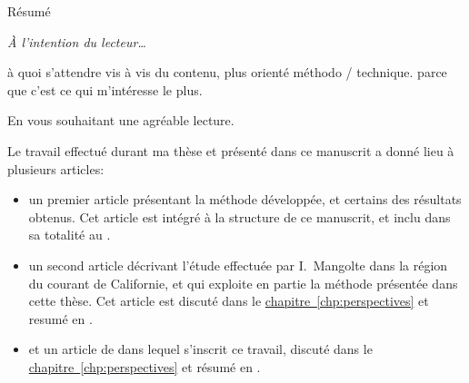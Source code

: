 
Résumé


\clearpage

\vspace{5\onelineskip}
\par\addvspace{\beforesecskip}\addvspace{\baselineskip}
\textit{À l'intention du lecteur\dots}\par
\vspace{\aftersecskip}

à quoi s'attendre vis à vis du contenu, plus orienté méthodo / technique.
parce que c'est ce qui m'intéresse le plus.

En vous souhaitant une agréable lecture.

\clearpage
{}
\label{sec:productions}

\begingroup
\resetbegentry
Le travail effectué durant ma thèse et présenté dans ce manuscrit a donné lieu à plusieurs articles:
\begin{itemize}
  \item un premier article présentant la méthode développée, et certains des résultats obtenus.
        Cet article est intégré à la structure de ce manuscrit, et inclu dans sa totalité au .
        \begin{note}[before upper={}]\end{note}

  \item un second article décrivant l'étude effectuée par I.\ Mangolte dans la région du courant de Californie, et qui exploite en partie la méthode présentée dans cette thèse. Cet article est discuté dans le \hyperref[sec:CCE]{chapitre~\ref{chp:perspectives}} et resumé en .
        \begin{note}[before upper={}]\end{note}

  \item et un article de  dans lequel s’inscrit ce travail, discuté dans le \hyperref[sec:review]{chapitre~\ref{chp:perspectives}} et résumé en .
        \begin{note}[before upper={}]\end{note}

\end{itemize}
\medskip
\endgroup

